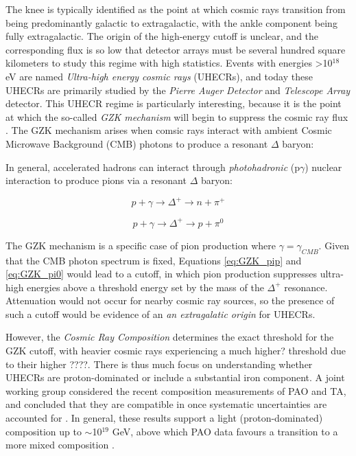 The knee is typically identified as the point at which cosmic rays transition from being predominantly galactic to extragalactic, with the ankle component being fully extragalactic. The origin of the high-energy cutoff is unclear, and the corresponding flux is so low that detector arrays must be several hundred square kilometers to study this regime with high statistics. Events with energies >10$^{18}$ eV are named \emph{Ultra-high energy cosmic rays} (UHECRs), and today these UHECRs are primarily studied by the \emph{Pierre Auger Detector} and \emph {Telescope Array} detector. This UHECR regime is particularly interesting, because it is the point at which the so-called \emph{GZK mechanism} will begin to suppress the cosmic ray flux . The GZK mechanism arises when comsic rays interact with ambient Cosmic Microwave Background (CMB) photons to produce a resonant $\Delta$ baryon:

In general, accelerated hadrons can interact through \emph{photohadronic} (p$\gamma$) nuclear interaction to produce pions via a resonant $\Delta$ baryon:

\begin{equation}
	p + \gamma \rightarrow \Delta^{+} \rightarrow n + \pi^{+}
	\label{eq:GZK_pip}
\end{equation}

\begin{equation}
	p + \gamma \rightarrow \Delta^{+} \rightarrow p + \pi^{0}
	\label{eq:GZK_pi0}
\end{equation}

The GZK mechanism is a specific case of pion production where $\gamma = \gamma_{CMB}$. Given that the CMB photon spectrum is fixed, Equations \ref{eq:GZK_pip} and \ref{eq:GZK_pi0} would lead to a cutoff, in which pion production suppresses ultra-high energies above a threshold energy set by the mass of the $\Delta^{+}$ resonance. Attenuation would not occur for nearby cosmic ray sources, so the presence of such a cutoff would be evidence of an \emph{an extragalatic origin} for UHECRs. 

However, the \emph{Cosmic Ray Composition} determines the exact threshold for the GZK cutoff, with heavier cosmic rays experiencing a much higher? threshold due to their higher ????. There is thus much focus on understanding whether UHECRs are proton-dominated or include a substantial iron component. A joint working group considered the recent composition measurements of PAO and TA, and concluded that they are compatible in once systematic uncertainties are accounted for . In general, these results support a light (proton-dominated) composition up to $\sim$10$^{19}$ GeV, above which PAO data favours a transition to a more mixed composition . 

